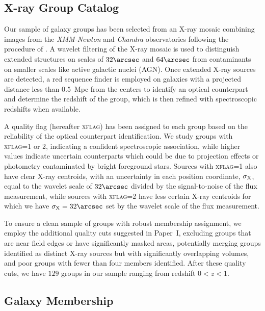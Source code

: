 \documentclass[12pt]{emulateapj}
\begin{document}
\subsection{X-ray Group Catalog}
\label{s:xray}

Our sample of galaxy groups has been selected from an X-ray mosaic
combining images from the {\sl XMM-Newton} \citep{Hasinger2007} and
{\sl Chandra} \citep{Elvis2009} observatories following the procedure
of \citet{Finoguenov2009, Finoguenov2010}. A wavelet filtering of the
X-ray mosaic is used to distinguish extended structures on scales of
$32\arcsec$ and $64\arcsec$ from contaminants on smaller scales like
active galactic nuclei (AGN). Once extended X-ray sources are
detected, a red sequence finder is employed on galaxies with a
projected distance less than $0.5$~Mpc from the centers to identify an
optical counterpart and determine the redshift of the group, which is
then refined with spectroscopic redshifts when available.

A quality flag (hereafter \textsc{xflag}) has been assigned to each group
based on the reliability of the optical counterpart identification. We
study groups with \textsc{xflag}=1 or 2, indicating a confident spectroscopic
association, while higher values indicate uncertain counterparts which
could be due to projection effects or photometry contaminated by
bright foreground stars. Sources with \textsc{xflag}=1 also have clear
X-ray centroids, with an uncertainty in each position coordinate,
$\sigma_{\rm X}$, equal to the wavelet scale of $32\arcsec$ divided by
the signal-to-noise of the flux measurement, while sources with
\textsc{xflag}=2 have less certain X-ray centroids for which we have
$\sigma_{\rm X} = 32\arcsec$ set by the wavelet scale of the flux
measurement. 

To ensure a clean sample of groups with robust membership assignment,
we employ the additional quality cuts suggested in Paper~I, excluding
groups that are near field edges or have significantly masked areas,
potentially merging groups identified as distinct X-ray sources but
with significantly overlapping volumes, and poor groups with fewer
than four members identified. After these quality cuts, we have $129$
groups in our sample ranging from redshift $0<z<1$.


\subsection{Galaxy Membership}
\label{s:membership}
\end{document}
